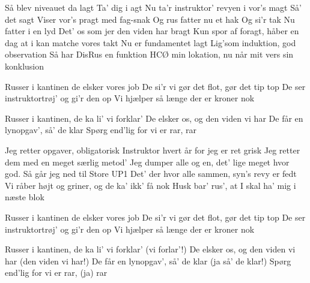 \documentclass[a4paper,11pt]{article}
\begin{document}
\begin{song}
 Så blev niveauet da lagt
Ta' dig i agt
Nu ta'r instruktor' revyen i vor's magt
Så' det sagt
Viser vor's pragt med fag-snak
Og rus fatter nu et hak
Og si'r tak
Nu fatter i en lyd
Det' os som jer den viden har bragt
Kun spor af foragt, håber en dag at i kan matche vores takt
Nu er fundamentet lagt
Lig'som induktion, god observation
Så har DisRus en funktion
HCØ min lokation, nu når mit vers sin konklusion

 Russer i kantinen de elsker vores job
De si'r vi gør det flot, gør det tip top
De ser instruktortrøj' og gi'r den op
Vi hjælper så længe der er kroner nok

 Russer i kantinen, de ka li' vi forklar'
De elsker os, og den viden vi har
De får en lynopgav', så' de klar
Spørg end'lig for vi er rar, rar

 Jeg retter opgaver, obligatorisk
Instruktor hvert år for jeg er ret grisk
Jeg retter dem med en meget særlig metod'
Jeg dumper alle og en, det' lige meget hvor god.
Så går jeg ned til Store UP1
Det' der hvor alle sammen, syn's revy er fedt
Vi råber højt og griner, og de ka' ikk' få nok
Husk bar' rus', at I skal ha' mig i næste blok

 Russer i kantinen de elsker vores job
De si'r vi gør det flot, gør det tip top
De ser instruktortrøj' og gi'r den op
Vi hjælper så længe der er kroner nok

 Russer i kantinen, de ka li' vi forklar' (vi forlar'!)
De elsker os, og den viden vi har (den viden vi har!)
De får en lynopgav', så' de klar (ja så' de klar!)
Spørg end'lig for vi er rar, (ja) rar
\end{song}
\end{document}
